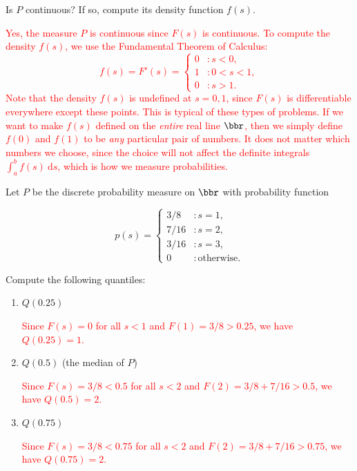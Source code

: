 \documentclass[12pt,reqno]{amsart}
\begin{document}
Is $P$ continuous? If so, compute its density function $f(s)$.

\bigskip
\textcolor{red}{Yes, the measure $P$ is continuous since $F(s)$ is continuous. To compute the density $f(s)$, we use the Fundamental Theorem of Calculus:
    \[f(s) = F'(s) = \begin{cases}
        0 & : s < 0, \\
        1 & : 0 < s < 1, \\
        0 & : s>1.
    \end{cases}\]
Note that the density $f(s)$ is undefined at $s=0,1$, since $F(s)$ is differentiable everywhere except these points. This is typical of these types of problems. If we want to make $f(s)$ defined on the \textit{entire} real line $\bbr$, then we simply define $f(0)$ and $f(1)$ to be \textit{any} particular pair of numbers. It does not matter which numbers we choose, since the choice will not affect the definite integrals $\int_a^b f(s) \ \text{d} s$, which is how we measure probabilities.}
















\bigskip
\prob Let $P$ be the discrete probability measure on $\bbr$ with probability function

    \[p(s) = \begin{cases}
        3/8 & : s=1, \\
        7/16 & : s=2, \\
        3/16 & : s=3, \\
        0 & : \text{otherwise}.
    \end{cases}\]

Compute the following quantiles:

\medskip
\begin{enumerate}
    \item $Q(0.25)$
    
    \bigskip
    \textcolor{red}{Since $F(s)=0$ for all $s<1$ and $F(1)=3/8>0.25$, we have $Q(0.25) = 1$.}
    \bigskip

    \item $Q(0.5)$ (the median of $P$)
    
    \bigskip
    \textcolor{red}{Since $F(s)=3/8<0.5$ for all $s<2$ and $F(2)=3/8 + 7/16 >0.5$, we have $Q(0.5) = 2$.}
    \bigskip

    \item $Q(0.75)$
    
    \bigskip
    \textcolor{red}{Since $F(s)=3/8<0.75$ for all $s<2$ and $F(2)=3/8 + 7/16 >0.75$, we have $Q(0.75) = 2$.}
\end{enumerate}
\end{document}
